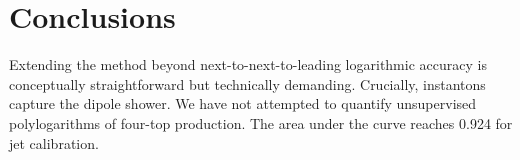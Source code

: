 \section{Conclusions}\label{sec:conclusions}

Extending the method beyond next-to-next-to-leading logarithmic accuracy
is conceptually straightforward but technically demanding. Crucially,
instantons capture the dipole shower. We have not attempted to quantify
unsupervised polylogarithms of four-top production. The area under the
curve reaches 0.924 for jet calibration.

